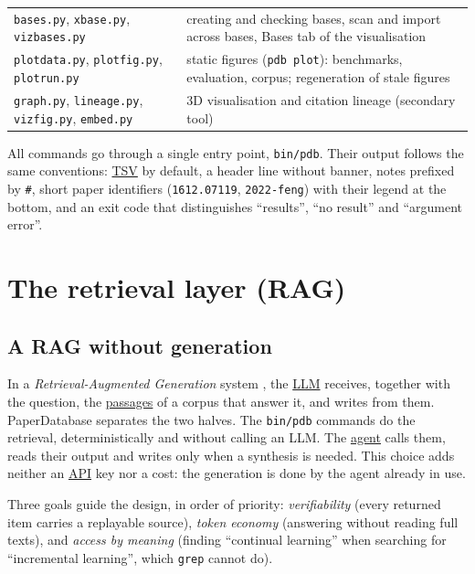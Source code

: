 \documentclass[11pt,a4paper]{article}
\newcommand{\cmd}[1]{\texttt{#1}}
\newcommand{\gl}[2]{\hyperlink{gl:#1}{\textcolor{glcolor}{#2}}}
\begin{document}
\begin{table}[ht]
\begin{tabularx}{\linewidth}{@{}lL@{}}
\cmd{bases.py}, \cmd{xbase.py}, \cmd{vizbases.py} & creating and checking bases, scan and import across bases, Bases tab of the visualisation \\
\cmd{plotdata.py}, \cmd{plotfig.py}, \cmd{plotrun.py} & static figures (\cmd{pdb plot}): benchmarks, evaluation, corpus; regeneration of stale figures \\
\cmd{graph.py}, \cmd{lineage.py}, \cmd{vizfig.py}, \cmd{embed.py} & 3D visualisation and citation lineage (secondary tool) \\
\bottomrule
\end{tabularx}
\end{table}

All commands go through a single entry point, \cmd{bin/pdb}. Their output follows the same
conventions: \gl{CSV}{TSV} by default, a header line without banner, notes prefixed by \cmd{\#}, short
paper identifiers (\cmd{1612.07119}, \cmd{2022-feng}) with their legend at the bottom, and an
exit code that distinguishes ``results'', ``no result'' and ``argument error''.

\section{The retrieval layer (RAG)}
\label{sec:rag}

\subsection{A RAG without generation}

In a \emph{Retrieval-Augmented Generation} system \citep{lewis2020rag}, the \gl{LLM}{LLM} receives,
together with the question, the \gl{passage}{passages} of a corpus that answer it, and writes from them.
PaperDatabase separates the two halves. The \cmd{bin/pdb} commands do the retrieval,
deterministically and without calling an LLM. The \gl{agent}{agent} calls them, reads their output and
writes only when a synthesis is needed. This choice adds neither an \gl{API}{API} key nor a cost: the
generation is done by the agent already in use.

Three goals guide the design, in order of priority: \emph{verifiability} (every returned
item carries a replayable source), \emph{token economy} (answering without reading full
texts), and \emph{access by meaning} (finding ``continual learning'' when searching for
``incremental learning'', which \cmd{grep} cannot do).
\end{document}
